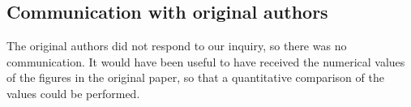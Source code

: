 \subsection{Communication with original authors}
The original authors did not respond to our inquiry, so there was no communication. It would have been useful to have received the numerical values of the figures in the original paper, so that a quantitative comparison of the values could be performed.